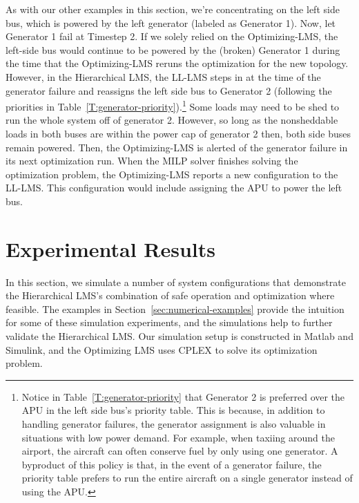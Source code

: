 \documentclass{acm_proc_article-sp}
\begin{document}
As with our other examples in this section, we're concentrating on the left side bus, which is powered by the left generator (labeled as Generator 1).
Now, let Generator 1 fail at Timestep 2. 
If we solely relied on the Optimizing-LMS, the left-side bus would continue to be powered by the (broken) Generator 1 during the time that the Optimizing-LMS reruns the optimization for the new topology.
However, in the Hierarchical LMS, the LL-LMS steps in at the time of the generator failure and reassigns the left side bus to Generator 2 (following the priorities in Table~\ref{T:generator-priority}).\footnote{Notice in Table~\ref{T:generator-priority} that Generator 2 is preferred over the APU in the left side bus's priority table. This is because, in addition to handling generator failures, the generator assignment is also valuable in situations with low power demand. For example, when taxiing around the airport, the aircraft can often conserve fuel by only using one generator. A byproduct of this policy is that, in the event of a generator failure, the priority table prefers to run the entire aircraft on a single generator instead of using the APU.}
Some loads may need to be shed to run the whole system off of generator 2.
However, so long as the nonsheddable loads in both buses are within the power cap of generator 2 then, both side buses remain powered. 
Then, the Optimizing-LMS is alerted of the generator failure in its next optimization run. 
When the MILP solver finishes solving the optimization problem, the Optimizing-LMS reports a new configuration to the LL-LMS. 
This configuration would include assigning the APU to power the left bus.


\section{Experimental Results}
In this section, we simulate a number of system configurations that demonstrate the Hierarchical LMS's combination of safe operation and optimization where feasible.
The examples in Section~\ref{sec:numerical-examples} provide the intuition for some of these simulation experiments, and the simulations help to further validate the Hierarchical LMS.
Our simulation setup is constructed in Matlab and Simulink, and the Optimizing LMS uses CPLEX to solve its optimization problem.
\end{document}
